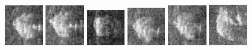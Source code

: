 \begin{figure}
    \includegraphics[width=0.15\textwidth]{chapters/images/dataset/all-class-images/drinkCarton/drinkCarton-336.jpg}
    \includegraphics[width=0.15\textwidth]{chapters/images/dataset/all-class-images/drinkCarton/drinkCarton-309.jpg}
    \includegraphics[width=0.15\textwidth]{chapters/images/dataset/all-class-images/drinkCarton/drinkCarton-39.jpg}
    \includegraphics[width=0.15\textwidth]{chapters/images/dataset/all-class-images/drinkCarton/drinkCarton-189.jpg}
    \includegraphics[width=0.15\textwidth]{chapters/images/dataset/all-class-images/drinkCarton/drinkCarton-204.jpg}
    \includegraphics[width=0.15\textwidth]{chapters/images/dataset/all-class-images/drinkCarton/drinkCarton-81.jpg}
    

\end{figure}
